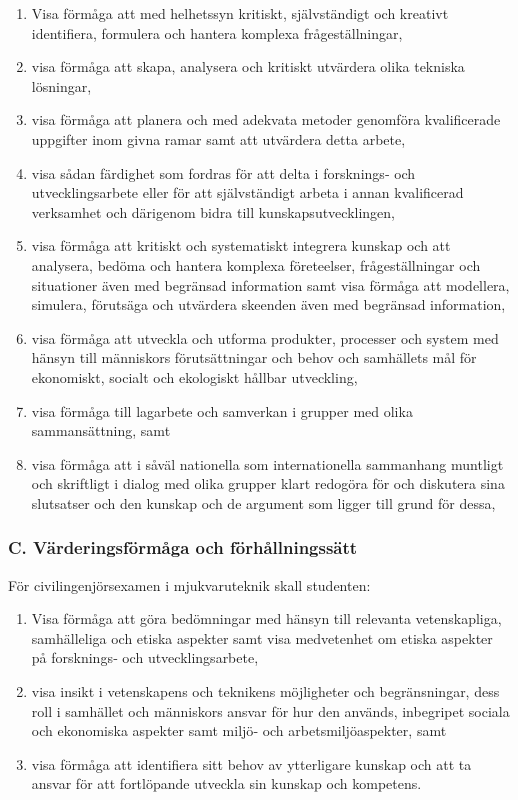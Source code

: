 \begin{enumerate}
\def\labelenumi{B.\arabic{enumi}.}
\tightlist
\item
  Visa förmåga att med helhetssyn kritiskt, självständigt och kreativt
  identifiera, formulera och hantera komplexa frågeställningar,
\item
  visa förmåga att skapa, analysera och kritiskt utvärdera olika
  tekniska lösningar,
\item
  visa förmåga att planera och med adekvata metoder genomföra
  kvalificerade uppgifter inom givna ramar samt att utvärdera detta
  arbete,
\item
  visa sådan färdighet som fordras för att delta i forsknings‐ och
  utvecklingsarbete eller för att självständigt arbeta i annan
  kvalificerad verksamhet och därigenom bidra till kunskapsutvecklingen,
\item
  visa förmåga att kritiskt och systematiskt integrera kunskap och att
  analysera, bedöma och hantera komplexa företeelser, frågeställningar
  och situationer även med begränsad information samt visa förmåga att
  modellera, simulera, förutsäga och utvärdera skeenden även med
  begränsad information,
\item
  visa förmåga att utveckla och utforma produkter, processer och system
  med hänsyn till människors förutsättningar och behov och samhällets
  mål för ekonomiskt, socialt och ekologiskt hållbar utveckling,
\item
  visa förmåga till lagarbete och samverkan i grupper med olika
  sammansättning, samt
\item
  visa förmåga att i såväl nationella som internationella sammanhang
  muntligt och skriftligt i dialog med olika grupper klart redogöra för
  och diskutera sina slutsatser och den kunskap och de argument som
  ligger till grund för dessa,
\end{enumerate}

\subsubsection*{C. Värderingsförmåga och förhållningssätt}

För civilingenjörsexamen i mjukvaruteknik skall studenten:

\begin{enumerate}
\def\labelenumi{C.\arabic{enumi}.}
\tightlist
\item
  Visa förmåga att göra bedömningar med hänsyn till relevanta
  vetenskapliga, samhälleliga och etiska aspekter samt visa medvetenhet
  om etiska aspekter på forsknings‐ och utvecklingsarbete,
\item
  visa insikt i vetenskapens och teknikens möjligheter och
  begränsningar, dess roll i samhället och människors ansvar för hur den
  används, inbegripet sociala och ekonomiska aspekter samt miljö‐ och
  arbetsmiljöaspekter, samt
\item
  visa förmåga att identifiera sitt behov av ytterligare kunskap och att
  ta ansvar för att fortlöpande utveckla sin kunskap och kompetens.
\end{enumerate}

